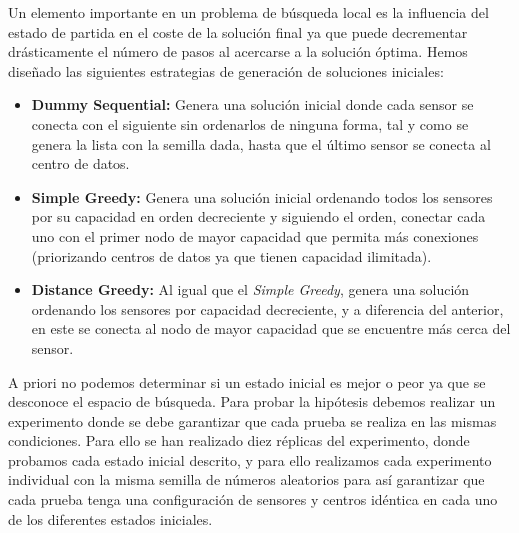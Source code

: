\documentclass{article}
\begin{document}
\begin{enumerate}
  Un elemento importante en un problema de búsqueda local es la influencia del estado de partida en el coste de la solución final ya que puede decrementar drásticamente el número de pasos al acercarse a la solución óptima. Hemos diseñado las siguientes estrategias de generación de soluciones iniciales:
  \begin{itemize}
    \item \textbf{Dummy Sequential:} Genera una solución inicial donde cada sensor se conecta con el siguiente sin ordenarlos de ninguna forma, tal y como se genera la lista con la semilla dada, hasta que el último sensor se conecta al centro de datos.
    \item \textbf{Simple Greedy:} Genera una solución inicial ordenando todos los sensores por su capacidad en orden decreciente y siguiendo el orden, conectar cada uno con el primer nodo de mayor capacidad que permita más conexiones (priorizando centros de datos ya que tienen capacidad ilimitada).
    \item \textbf{Distance Greedy:} Al igual que el \textit{Simple Greedy}, genera una solución ordenando los sensores por capacidad decreciente, y a diferencia del anterior, en este se conecta al nodo de mayor capacidad que se encuentre más cerca del sensor.
  \end{itemize}

  A priori no podemos determinar si un estado inicial es mejor o peor ya que se desconoce el espacio de búsqueda. Para probar la hipótesis debemos realizar un experimento donde se debe garantizar que cada prueba se realiza en las mismas condiciones. Para ello se han realizado diez réplicas del experimento, donde probamos cada estado inicial descrito, y para ello realizamos cada experimento individual con la misma semilla de números aleatorios para así garantizar que cada prueba tenga una configuración de sensores y centros idéntica en cada uno de los diferentes estados iniciales.\par


\end{enumerate}
\end{document}
